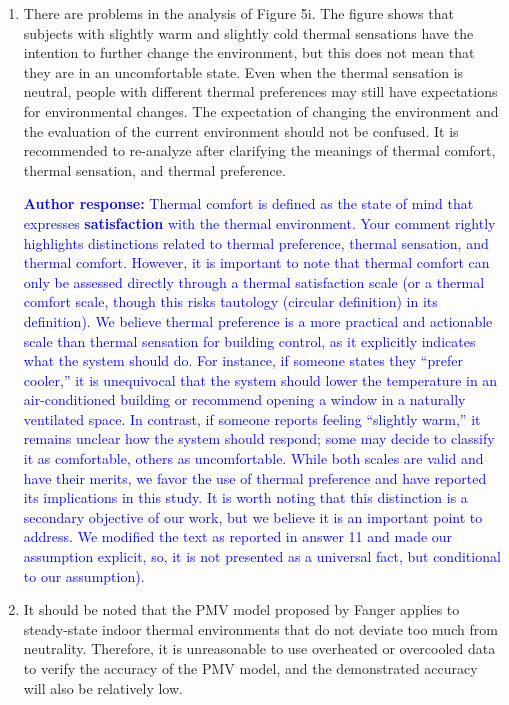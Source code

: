 \documentclass[a4paper, 10pt]{letter}
\newcommand{\response}[1]{\textcolor{blue}{\textbf{Author response:} #1}}
\begin{document}
\begin{letter}
\begin{enumerate}
            \item There are problems in the analysis of Figure 5i.
            The figure shows that subjects with slightly warm and slightly cold thermal sensations have the intention to further change the environment, but this does not mean that they are in an uncomfortable state.
            Even when the thermal sensation is neutral, people with different thermal preferences may still have expectations for environmental changes.
            The expectation of changing the environment and the evaluation of the current environment should not be confused.
            It is recommended to re-analyze after clarifying the meanings of thermal comfort, thermal sensation, and thermal preference.

            \response{Thermal comfort is defined as the state of mind that expresses \textbf{satisfaction} with the thermal environment. 
            Your comment rightly highlights distinctions related to thermal preference, thermal sensation, and thermal comfort. 
            However, it is important to note that thermal comfort can only be assessed directly through a thermal satisfaction scale (or a thermal comfort scale, though this risks tautology (circular definition) in its definition). 
            We believe thermal preference is a more practical and actionable scale than thermal sensation for building control, as it explicitly indicates what the system should do. 
            For instance, if someone states they “prefer cooler,” it is unequivocal that the system should lower the temperature in an air-conditioned building or recommend opening a window in a naturally ventilated space. 
            In contrast, if someone reports feeling “slightly warm,” it remains unclear how the system should respond; some may decide to classify it as comfortable, others as uncomfortable. 
            While both scales are valid and have their merits, we favor the use of thermal preference and have reported its implications in this study. 
            It is worth noting that this distinction is a secondary objective of our work, but we believe it is an important point to address. 
            We modified the text as reported in answer 11 and made our assumption explicit, so, it is not presented as a universal fact, but conditional to our assumption).}

            \item It should be noted that the PMV model proposed by Fanger applies to steady-state indoor thermal environments that do not deviate too much from neutrality.
            Therefore, it is unreasonable to use overheated or overcooled data to verify the accuracy of the PMV model, and the demonstrated accuracy will also be relatively low.


\end{enumerate}
\end{letter}
\end{document}
